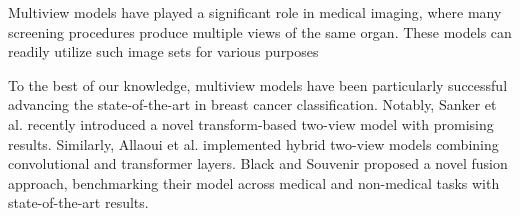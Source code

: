 Multiview models have played a significant role in medical imaging, where many screening procedures produce multiple views of the same organ. These models can readily utilize such image sets for various purposes \cite{swint_multiview, hybrid_mammo_net}

To the best of our knowledge, multiview models have been particularly successful advancing the state-of-the-art in breast cancer classification. Notably, Sanker et al. \cite{swint_multiview} recently introduced a novel transform-based two-view model with promising results. Similarly, Allaoui et al. \cite{hybrid_mammo_net} implemented hybrid two-view models combining convolutional and transformer layers.  Black and Souvenir \cite{multiview_hybrid_fusion_mutual_distill} proposed a novel fusion approach, benchmarking their model across medical and non-medical tasks with state-of-the-art results.